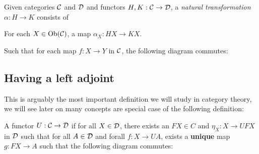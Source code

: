 \begin{defin}
    Given categories $\mathcal{C}$ and $\mathcal{D}$ and functors $H, K : \mathcal{C} \to \mathcal{D}$, a \textit{natural transformation} $\alpha : H \to K$ consists of
    \begin{itemize}
        For each $X\in \text{Ob}(\mathcal{C})$, a map $\alpha_X : H X \to K X$.
    \end{itemize}
    Such that for each map $f : X \to Y$ in $\mathcal{C}$, the following diagram commutes:
    \begin{center}
    \end{center}
\end{defin}

\subsection{Having a left adjoint}

This is arguably the most important definition we will study in category theory, we will see later on many concepts are special case of the following definition:

\begin{defin}
    A functor $U : \mathcal{C} \to \mathcal{D}$  if for all $X \in \mathcal{D}$, there exists an $FX \in C$ and $\eta_X : X \to UFX$ in $\mathcal{D}$ such that for all $A \in \mathcal{D}$ and forall $f : X \to UA$, \there exists a \textbf{unique} map $g : FX \to A$ such that the following diagram commutes:
    \begin{center}
    \end{center}
\end{defin}

